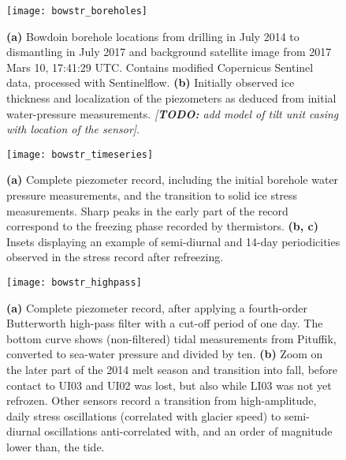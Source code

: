 \documentclass[utf8]{article}
\newcommand{\todo}[1]{\textcolor{c3}{\emph{[\textbf{TODO:} #1]}}}
\begin{document}
    \begin{figure}
      \centerline{\texttt{[image: bowstr\_boreholes]}}
      \caption{%
        \textbf{(a)}
          Bowdoin borehole locations from drilling in July 2014 to dismantling
          in July 2017 and background satellite image from 2017 Mars 10,
          17:41:29 UTC. Contains modified Copernicus Sentinel data, processed
          with Sentinelflow.
        \textbf{(b)}
          Initially observed ice thickness and localization of the piezometers
          as deduced from initial water-pressure measurements.
        \todo{add model of tilt unit casing with location of the sensor}.}
      \label{fig:boreholes}
    \end{figure}

    \begin{figure}
      \centerline{\texttt{[image: bowstr\_timeseries]}}
      \caption{%
        \textbf{(a)}
          Complete piezometer record, including the initial borehole water
          pressure measurements, and the transition to solid ice stress
          measurements. Sharp peaks in the early part of the record correspond
          to the freezing phase recorded by thermistors.
        \textbf{(b, c)}
          Insets displaying an example of semi-diurnal and 14-day periodicities
          observed in the stress record after refreezing.}
      \label{fig:timeseries}
    \end{figure}

    \begin{figure}
      \centerline{\texttt{[image: bowstr\_highpass]}}
      \caption{%
        \textbf{(a)}
          Complete piezometer record, after applying a fourth-order Butterworth
          high-pass filter with a cut-off period of one day. The bottom curve
          shows (non-filtered) tidal measurements from Pituffik, converted to
          sea-water pressure and divided by ten.
        \textbf{(b)}
          Zoom on the later part of the 2014 melt season and transition into
          fall, before contact to UI03 and UI02 was lost, but also while LI03
          was not yet refrozen. Other sensors record a transition from
          high-amplitude, daily stress oscillations (correlated with glacier
          speed) to semi-diurnal oscillations anti-correlated with, and an
          order of magnitude lower than, the tide.}
      \label{fig:highpass}
    \end{figure}
\end{document}
